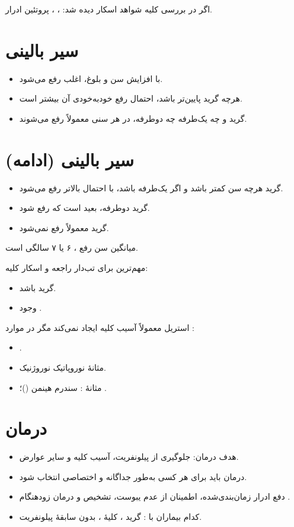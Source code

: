اگر در بررسی کلیه شواهد اسکار دیده شد: ، ، پروتئین ادرار.

\section*{سیر بالینی}
\begin{itemize}
\item با افزایش سن و بلوغ،  اغلب رفع می‌شود.
\item هرچه گرید پایین‌تر باشد، احتمال رفع خودبه‌خودی آن بیشتر است.
\item گرید  و  چه یک‌طرفه چه دوطرفه، در هر سنی معمولاً رفع می‌شوند.
\end{itemize}

\section*{سیر بالینی (ادامه)}
\begin{itemize}
\item گرید  هرچه سن کمتر باشد و اگر یک‌طرفه باشد، با احتمال بالاتر رفع می‌شود.
\item گرید  دوطرفه، بعید است که رفع شود.
\item گرید  معمولاً رفع نمی‌شود.
\end{itemize}
میانگین سن رفع ، ۶ یا ۷ سالگی است.

مهم‌ترین  برای  تب‌دار راجعه و اسکار کلیه:
\begin{itemize}
\item گرید  باشد.
\item وجود .
\end{itemize}
 استریل معمولاً آسیب کلیه ایجاد نمی‌کند مگر در موارد :
\begin{itemize}
\item {}.
\item مثانهٔ نوروپاتیک نوروژنیک.
\item مثانهٔ : سندرم هینمن ()؛ .
\end{itemize}
\section*{درمان}
\begin{itemize}
\item هدف درمان: جلوگیری از پیلونفریت، آسیب کلیه و سایر عوارض.
\item درمان باید برای هر کسی به‌طور جداگانه و اختصاصی انتخاب شود.
\item دفع ادرار زمان‌بندی‌شده، اطمینان از عدم یبوست، تشخیص و درمان زودهنگام .
\item کدام بیماران با : گرید ، کلیهٔ ، بدون سابقهٔ پیلونفریت.
\end{itemize}

